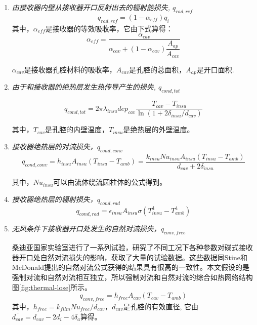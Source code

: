 \begin{enumerate}[label=(\arabic*)]
  \item \emph{由接收器内壁从接收器开口反射出去的辐射能损失, $q_{rad,ref}$}
  \begin{equation}
    q_{rad,ref}=(1-\alpha_{eff})q_{i}
\end{equation}
    其中，$\alpha_{eff}$是接收器的等效吸收率，它由下式算得：
    \begin{equation}
    \alpha_{eff}=\frac{\alpha_{cav}}{\alpha_{cav}+(1-\alpha_{cav})\dfrac{A_{ap}}{A_{cav}}}
    \end{equation}
    
    $\alpha_{cav}$是接收器孔腔材料的吸收率，$A_{cav}$是孔腔的总面积，$A_{ap}$是开口面积.
  \item \emph{由于和接收器的绝热层发生热传导产生的损失, $q_{cond,tot}$}
  
  \begin{equation}
q_{cond,tot}=2\pi\lambda_{insu}dep_{cav}\dfrac{T_{cav}-T_{insu}}{\ln(1 + 2\delta_{insu}/d_{cav})}
    \end{equation}
    
    其中，$T_{cav}$是孔腔的内壁温度，$T_{insu}$是绝热层的外壁温度。

  \item \emph{接收器绝热层的对流损失，$q_{cond,conv}$}  
  \begin{equation}
	q_{cond,conv}=h_{insu}A_{insu}(T_{insu}-T_{amb})
	=\dfrac{k_{insu}Nu_{insu}A_{insu}(T_{insu}-T_{amb})}{d_{cav}+2\delta_{insu}}
\end{equation}

其中，$Nu_{insu}$可以由流体绕流圆柱体的公式得到。~\cite{Churchill1977}

  \item \emph{接收器绝热层的辐射损失，$q_{cond,rad}$}  
  \begin{equation}
	q_{cond,rad}=\epsilon_{insu}A_{insu}\sigma(T_{insu}^4 - T_{amb}^4)
\end{equation}
  \item \emph{无风条件下接收器开口处发生的自然对流损失，$q_{conv,free}$}
    
  桑迪亚国家实验室进行了一系列试验，研究了不同工况下各种参数对碟式接收器开口处自然对流损失的影响，获取了大量的试验数据\cite{Ma1993}。这些数据同Stine和McDonald提出的自然对流公式获得的结果具有很高的一致性。本文假设的是强制对流和自然对流相互独立，所以强制对流和自然对流的综合如热网络结构图\ref{fig:thermal-lose}所示。
  \begin{equation}
	q_{conv,free} = h_{free}A_{cav}(T_{cav}-T_{amb})
\end{equation}
其中，$h_{free}=k_{film}Nu_{free}/\overline{d_{cav}}$，$\overline{d_{cav}}$是孔腔的有效直径, 它由$\overline{d_{cav}}=d_{cav}-2d_i-4 \delta_a$算得。
  

\end{enumerate}
